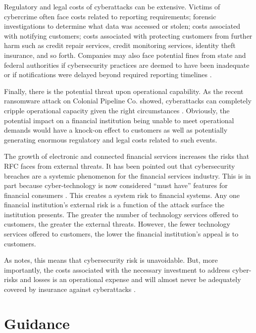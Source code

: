 Regulatory and legal costs of cyberattacks can be extensive. Victims of cybercrime often face costs related to reporting requirements; forensic investigations to determine what data was accessed or stolen; costs associated with notifying customers; costs associated with protecting customers from further harm such as credit repair services, credit monitoring services, identity theft insurance, and so forth. Companies may also face potential fines from state and federal authorities if cybersecurity practices are deemed to have been inadequate or if notifications were delayed beyond required reporting timelines \parencite{baerVictimsSolarWindsCyberattack2021}.

Finally, there is the potential threat upon operational capability. As the recent ransomware attack on Colonial Pipeline Co. showed, cyberattacks can completely cripple operational capacity given the right circumstances \parencite{neumanWhatWeKnow2021}. Obviously, the potential impact on a financial institution being unable to meet operational demands would have a knock-on effect to customers as well as potentially generating enormous regulatory and legal costs related to such events.

The growth of electronic and connected financial services increases the risks that RFC faces from external threats. It has been pointed out that cybersecurity breaches are a systemic phenomenon for the financial services industry. This is in part because cyber-technology is now considered ``must have'' features for financial consumers \parencite{uddinCybersecurityHazardsFinancial2020}. This creates a system risk to financial systems. Any one financial institution's external risk is a function of the attack surface the institution presents. The greater the number of technology services offered to customers, the greater the external threats. However, the fewer technology services offered to customers, the lower the financial institution's appeal is to customers.

As \textcite{uddinCybersecurityHazardsFinancial2020} notes, this means that cybersecurity risk is unavoidable. But, more importantly, the costs associated with the necessary investment to address cyber-risks and losses is an operational expense and will almost never be adequately covered by insurance against cyberattacks \parencite{lowInsuringCyberattacks2017}.

\section{Guidance}

